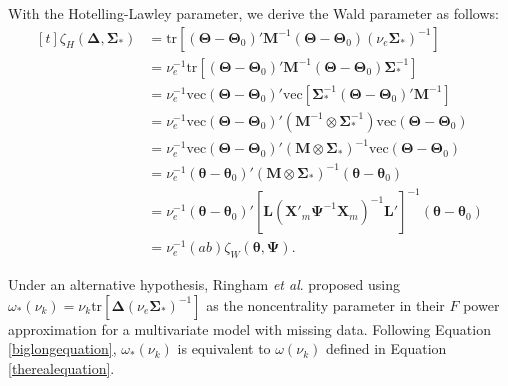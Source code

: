 \documentclass[11pt]{article}
\begin{document}
With the Hotelling-Lawley parameter, we derive the Wald parameter as follows:
\begin{equation}
\label{biglongequation}
\begin{aligned}[t]
\zeta_{H}\left(\boldsymbol{\Delta}, \boldsymbol{\Sigma}_{\ast}\right)
&=\text{tr}\left[\left(\boldsymbol{\Theta}-\boldsymbol{\Theta}_{0}\right)'\boldsymbol{M}^{-1}\left(\boldsymbol{\Theta}-\boldsymbol{\Theta}_{0}\right)\left(\nu_{e}\boldsymbol{\Sigma}_{\ast}\right)^{-1}\right]\\
&=\nu_{e}^{-1}\text{tr}\left[\left(\boldsymbol{\Theta}-\boldsymbol{\Theta}_{0}\right)'\boldsymbol{M}^{-1}\left(\boldsymbol{\Theta}-\boldsymbol{\Theta}_{0}\right)\boldsymbol{\Sigma}_{\ast}^{-1}\right]\\
&=\nu_{e}^{-1}\text{vec}\left(\boldsymbol{\Theta}-\boldsymbol{\Theta}_{0}\right)'\text{vec}\left[\boldsymbol{\Sigma}_{\ast}^{-1}\left(\boldsymbol{\Theta}-\boldsymbol{\Theta}_{0}\right)'\boldsymbol{M}^{-1}\right]\\
&=\nu_{e}^{-1}\text{vec}\left(\boldsymbol{\Theta}-\boldsymbol{\Theta}_{0}\right)'\left(\boldsymbol{M}^{-1}\otimes\boldsymbol{\Sigma}_{\ast}^{-1}\right)\text{vec}\left(\boldsymbol{\Theta}-\boldsymbol{\Theta}_{0}\right)\\
&=\nu_{e}^{-1}\text{vec}\left(\boldsymbol{\Theta}-\boldsymbol{\Theta}_{0}\right)'\left(\boldsymbol{M}\otimes\boldsymbol{\Sigma}_{\ast}\right)^{-1}\text{vec}\left(\boldsymbol{\Theta}-\boldsymbol{\Theta}_{0}\right)\\
&=\nu_{e}^{-1}\left(\boldsymbol{\theta}-\boldsymbol{\theta}_{0}\right)'\left(\boldsymbol{M}\otimes\boldsymbol{\Sigma}_{\ast}\right)^{-1}\left(\boldsymbol{\theta}-\boldsymbol{\theta}_{0}\right)\\
&=\nu_{e}^{-1}\left(\boldsymbol{\theta}-\boldsymbol{\theta}_{0}\right)'\left[\boldsymbol{L}\left(\boldsymbol{X}'_{m}\boldsymbol{\Psi}^{-1}\boldsymbol{X}_{m}\right)^{-1}\boldsymbol{L}'\right]^{-1}\left(\boldsymbol{\theta}-\boldsymbol{\theta}_{0}\right)\\
&=\nu_e^{-1}\left(ab\right)\zeta_{W}(\boldsymbol{\theta}, \boldsymbol{\Psi}).
\end{aligned}
\end{equation}

Under an alternative hypothesis, Ringham \textit{et al}. \cite{ringham_multivariate_2016} proposed using $\omega_{\ast}\left(\nu_{k}\right)=\nu_{k}\text{tr}\left[\boldsymbol{\Delta}\left(\nu_{e}\boldsymbol{\Sigma}_{\ast}\right)^{-1}\right]$ as the noncentrality parameter in their $F$ power approximation for a multivariate model with missing data. Following Equation \ref{biglongequation}, $\omega_{\ast}\left(\nu_{k}\right)$ is equivalent to $\omega\left(\nu_{k}\right)$ defined in Equation \ref{therealequation}.
\end{document}
